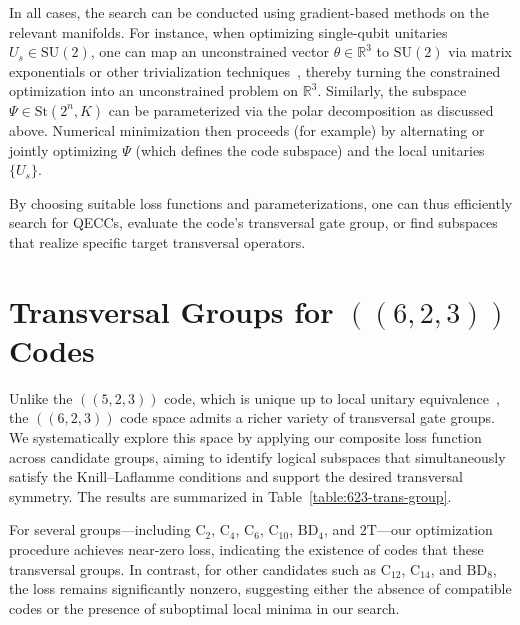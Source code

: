 \documentclass[8pt]{article}
\theoremstyle{definition}
\begin{document}
In all cases, the search can be conducted using gradient-based methods on the relevant manifolds. For instance, when optimizing single-qubit unitaries \(U_s\in \mathrm{SU}(2)\), one can map an unconstrained vector \(\theta\in \mathbb{R}^3\) to \(\mathrm{SU}(2)\) via matrix exponentials or other trivialization techniques~\cite{lezcano2019trivializations}, thereby turning the constrained optimization into an unconstrained problem on \(\mathbb{R}^3\). Similarly, the subspace \(\Psi \in\mathrm{St}(2^n,K)\) can be parameterized via the polar decomposition as discussed above. Numerical minimization then proceeds (for example) by alternating or jointly optimizing \(\Psi\) (which defines the code subspace) and the local unitaries \(\{U_s\}\).

By choosing suitable loss functions and parameterizations, one can thus efficiently search for QECCs, evaluate the code's transversal gate group, or find subspaces that realize specific target transversal operators.

\section{Transversal Groups for \texorpdfstring{$((6,2,3))$}{((6,2,3))} Codes}

Unlike the \(((5,2,3))\) code, which is unique up to local unitary equivalence~\cite{rains1999quantumCodes}, the \(((6,2,3))\) code space admits a richer variety of transversal gate groups. We systematically explore this space by applying our composite loss function across candidate groups, aiming to identify logical subspaces that simultaneously satisfy the Knill–Laflamme conditions and support the desired transversal symmetry. The results are summarized in Table~\ref{table:623-trans-group}.

For several groups—including $\mathrm{C}_2$, $\mathrm{C}_4$, $\mathrm{C}_6$, $\mathrm{C}_{10}$, $\mathrm{BD}_4$, and $2\mathrm{T}$—our optimization procedure achieves near-zero loss, indicating the existence of codes that   these transversal groups. In contrast, for other candidates such as $\mathrm{C}_{12}$, $\mathrm{C}_{14}$, and $\mathrm{BD}_8$, the loss remains significantly nonzero, suggesting either the absence of compatible codes or the presence of suboptimal local minima in our search.
\end{document}
